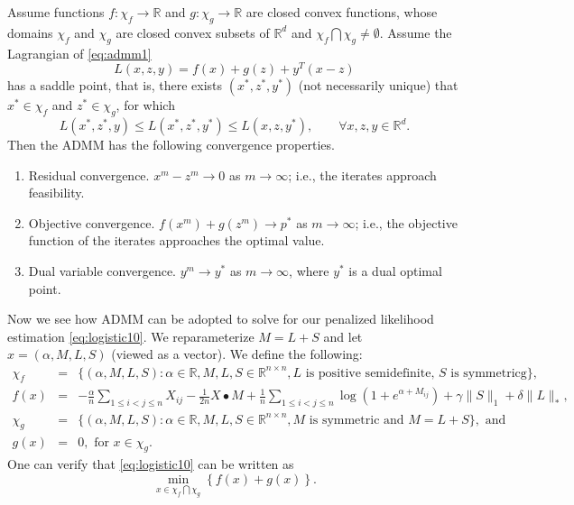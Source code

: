 \documentclass[AMS,STIX1COL]{WileyNJD-v2}
\begin{document}
\begin{theorem}[Boyd et al., 2011]
Assume functions $f: \chi_f \to \mathbb{R}$ and
$g: \chi_g \to \mathbb{R}$ are
closed convex functions, whose domains $\chi_f$ and $\chi_g$
are closed convex subsets of $\mathbb{R}^d$ and
$\chi_f \bigcap \chi_g \neq \emptyset$.
Assume the Lagrangian of \eqref{eq:admm1}
$$
L(x,z,y) = f(x) + g(z) + y^T(x-z)
$$
has a saddle point, that is, there exists $(x^\ast, z^\ast, y^\ast)$ (not necessarily unique) that $x^\ast \in \chi_f$ and
$z^\ast \in \chi_g$, for which
$$
L(x^\ast, z^\ast, y) \le L(x^\ast, z^\ast, y^\ast) \le
L(x, z, y^\ast), \qquad \forall x, z, y \in \mathbb{R}^d.
$$
Then the ADMM has the following convergence properties.
\begin{enumerate}
\item Residual convergence. $x^m - z^m \to 0$
as $m \to \infty$; i.e., the iterates approach feasibility.

\item Objective convergence. $f(x^m) + g(z^m) \to p^\ast$ as $m \to \infty$; i.e., the objective function of
the iterates approaches the optimal value.

\item Dual variable convergence. $y^m \to y^\ast$ as $m \to \infty$, where $y^\ast$ is a dual optimal point.

\end{enumerate}
\end{theorem}


Now we see how ADMM can be adopted to solve for our penalized likelihood estimation \eqref{eq:logistic10}.
We reparameterize $M = L + S$ and let $x = (\alpha, M, L, S)$ (viewed as a vector).
We define the following:
\begin{eqnarray*}
\chi_f &=& \{ (\alpha, M, L, S): \alpha\in\mathbb{R}, M, L, S \in \mathbb{R}^{n \times n},
L \mbox{ is positive semidefinite, }
S \mbox{ is symmetricg} \}, \\
f(x) &=&
-\frac{\alpha}{n} \sum_{1\le i< j\le n}X_{ij}
-\frac{1}{2n} X \bullet M %
+ \frac{1}{n}
\sum_{1\le i<j\le n} \log \left(1 + e^{\alpha + M_{ij}}\right)
+ \gamma \|S\|_1
+ \delta \|L\|_\ast, \\
\chi_g &=& \{ (\alpha, M, L, S): \alpha\in\mathbb{R}, M, L, S \in \mathbb{R}^{n \times n},
M \mbox{ is symmetric and } M=L+S \}, \mbox{ and }\\
g(x) &=& 0, \mbox{ for } x \in \chi_g.
\end{eqnarray*}
One can verify that \eqref{eq:logistic10} can be written as
$$
\min_{x \in \chi_f \bigcap \chi_g} \left\{f(x) + g(x) \right\}.
$$
\end{document}
